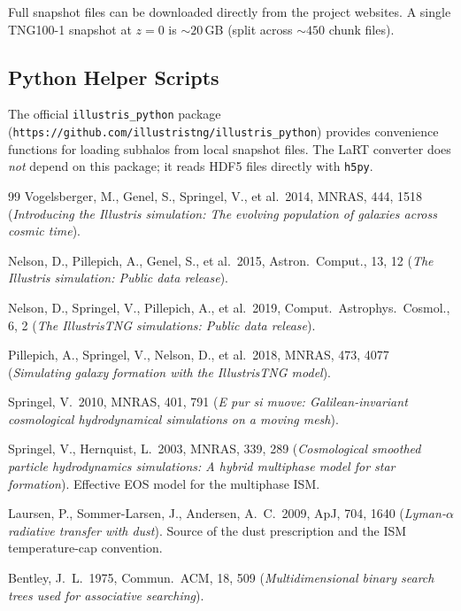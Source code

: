 \documentclass[english,a4paper]{my_memo}
\begin{document}
Full snapshot files can be downloaded directly from the project
websites.  A single TNG100-1 snapshot at $z=0$ is $\sim 20$\,GB
(split across $\sim 450$ chunk files).

\subsection{Python Helper Scripts}

The official \texttt{illustris\_python} package
(\texttt{https://github.com/illustristng/illustris\_python}) provides
convenience functions for loading subhalos from local snapshot files.
The LaRT converter does \emph{not} depend on this package; it reads
HDF5 files directly with \texttt{h5py}.


\begin{thebibliography}{99}
Vogelsberger, M., Genel, S., Springel, V., et al.\ 2014, MNRAS, 444, 1518
(\textit{Introducing the Illustris simulation: The evolving population of
galaxies across cosmic time}).

Nelson, D., Pillepich, A., Genel, S., et al.\ 2015, Astron.\ Comput., 13, 12
(\textit{The Illustris simulation: Public data release}).

Nelson, D., Springel, V., Pillepich, A., et al.\ 2019, Comput.\ Astrophys.\ Cosmol., 6, 2
(\textit{The IllustrisTNG simulations: Public data release}).

Pillepich, A., Springel, V., Nelson, D., et al.\ 2018, MNRAS, 473, 4077
(\textit{Simulating galaxy formation with the IllustrisTNG model}).

Springel, V.\ 2010, MNRAS, 401, 791
(\textit{E pur si muove: Galilean-invariant cosmological hydrodynamical
simulations on a moving mesh}).

Springel, V., Hernquist, L.\ 2003, MNRAS, 339, 289
(\textit{Cosmological smoothed particle hydrodynamics simulations: A
hybrid multiphase model for star formation}).
Effective EOS model for the multiphase ISM.

Laursen, P., Sommer-Larsen, J., Andersen, A.\ C.\ 2009, ApJ, 704, 1640
(\textit{Lyman-$\alpha$ radiative transfer with dust}).
Source of the dust prescription and the ISM temperature-cap convention.

Bentley, J.\ L.\ 1975, Commun.\ ACM, 18, 509
(\textit{Multidimensional binary search trees used for associative searching}).
\end{thebibliography}
\end{document}

